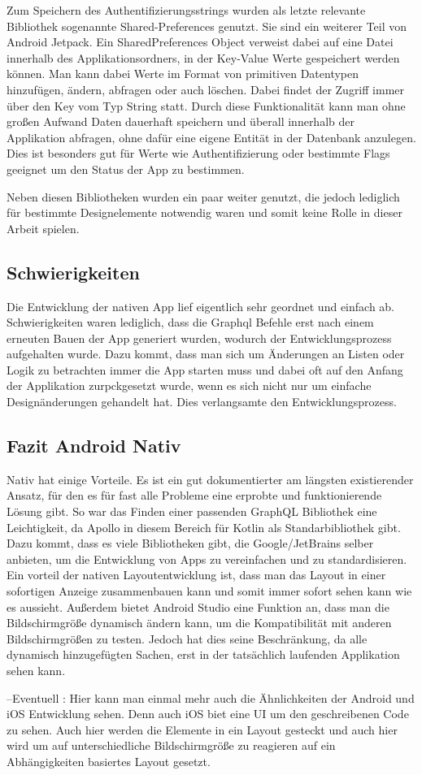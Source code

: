 Zum Speichern des Authentifizierungsstrings wurden als letzte relevante Bibliothek sogenannte Shared-Preferences genutzt. Sie sind ein weiterer Teil von Android Jetpack. Ein SharedPreferences Object verweist dabei auf eine Datei innerhalb des Applikationsordners, in der Key-Value Werte gespeichert werden können. Man kann dabei Werte im Format von primitiven Datentypen hinzufügen, ändern, abfragen oder auch löschen. Dabei findet der Zugriff immer über den Key vom Typ String statt. Durch diese Funktionalität kann man ohne großen Aufwand Daten dauerhaft speichern und überall innerhalb der Applikation abfragen, ohne dafür eine eigene Entität in der Datenbank anzulegen. Dies ist besonders gut für Werte wie Authentifizierung oder bestimmte Flags geeignet um den Status der App zu bestimmen.

Neben diesen Bibliotheken wurden ein paar weiter genutzt, die jedoch lediglich für bestimmte Designelemente notwendig waren und somit keine Rolle in dieser Arbeit spielen.

\subsection{Schwierigkeiten}
Die Entwicklung der nativen App lief eigentlich sehr geordnet und einfach ab. Schwierigkeiten waren lediglich, dass die Graphql Befehle erst nach einem erneuten Bauen der App generiert wurden, wodurch der Entwicklungsprozess aufgehalten wurde. Dazu kommt, dass man sich um Änderungen an Listen oder Logik zu betrachten immer die App starten muss und dabei oft auf den Anfang der Applikation zurpckgesetzt wurde, wenn es sich nicht nur um einfache Designänderungen gehandelt hat. Dies verlangsamte den Entwicklungsprozess.

\subsection{Fazit Android Nativ}
Nativ hat einige Vorteile. Es ist ein gut dokumentierter am längsten existierender Ansatz, für den es für fast alle Probleme eine erprobte und funktionierende Lösung gibt. So war das Finden einer passenden GraphQL Bibliothek eine Leichtigkeit, da Apollo in diesem Bereich für Kotlin als Standarbibliothek gibt. Dazu kommt, dass es viele Bibliotheken gibt, die Google/JetBrains selber anbieten, um die Entwicklung von Apps zu vereinfachen und zu standardisieren.  
Ein vorteil der nativen Layoutentwicklung ist, dass man das Layout in einer sofortigen Anzeige zusammenbauen kann und somit immer sofort sehen kann wie es aussieht. Außerdem bietet Android Studio eine Funktion an, dass man die Bildschirmgröße dynamisch ändern kann, um die Kompatibilität mit anderen Bildschirmgrößen zu testen. Jedoch hat dies seine Beschränkung, da alle dynamisch hinzugefügten Sachen, erst in der tatsächlich laufenden Applikation sehen kann.


 --Eventuell : Hier kann man einmal mehr auch die Ähnlichkeiten der Android und iOS Entwicklung sehen. Denn auch iOS biet eine UI um den geschreibenen Code zu sehen. Auch hier werden die Elemente in ein Layout gesteckt und auch hier wird um auf unterschiedliche Bildschirmgröße zu reagieren auf ein Abhängigkeiten basiertes Layout gesetzt.